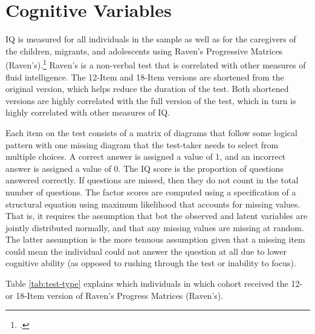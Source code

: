 \section{Cognitive Variables}
\label{sec:cog}

IQ is measured for all individuals in the sample as well as for the caregivers of the children, migrants, and adolescents using Raven's Progressive Matrices (Raven's).\footnote{\citet{Raven_Raven_etal_1988_BOOKManualRavensprogressive}.} Raven's is a non-verbal test that is correlated with other measures of fluid intelligence. The 12-Item and 18-Item versions are shortened from the original version, which helps reduce the duration of the test. Both shortened versions are highly correlated with the full version of the test, which in turn is highly correlated with other measures of IQ.

Each item on the test consists of a matrix of diagrams that follow some logical pattern with one missing diagram that the test-taker needs to select from multiple choices. A correct answer is assigned a value of 1, and an incorrect answer is assigned a value of 0. The IQ score is the proportion of questions answered correctly. If questions are missed, then they do not count in the total number of questions. The factor scores are computed using a specification of a structural equation using maximum likelihood that accounts for missing values. That is, it requires the assumption that bot the observed and latent variables are jointly distributed normally, and that any missing values are missing at random. The latter assumption is the more tenuous assumption given that a missing item could mean the individual could not answer the question at all due to lower cognitive ability (as opposed to rushing through the test or inability to focus).

 Table \ref{tab:test-type} explains which individuals in which cohort received the 12- or 18-Item version of Raven's Progress Matrices (Raven's).

